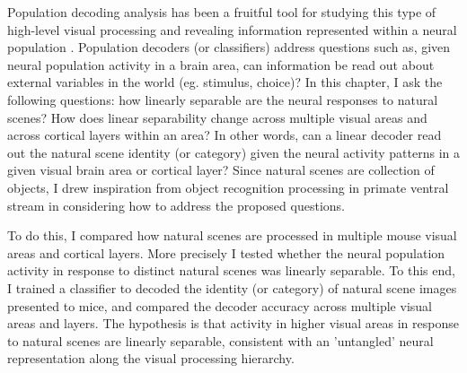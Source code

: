 Population decoding analysis has been a fruitful tool for studying this type of high-level visual processing and revealing information represented within a neural population \parencite{Hung2005,Rust2010a,Pagan2013}. Population decoders (or classifiers) address questions such as, given neural population activity in a brain area, can information be read out about external variables in the world (eg. stimulus, choice)? In this chapter, I ask the following questions: how linearly separable are the neural responses to natural scenes? How does linear separability change across multiple visual areas and across cortical layers within an area? In other words, can a linear decoder read out the natural scene identity (or category) given the neural activity patterns in a given visual brain area or cortical layer? Since natural scenes are collection of objects, I drew inspiration from object recognition processing in primate ventral stream in considering how to address the proposed questions.  

To do this, I compared how natural scenes are processed in multiple mouse visual areas and cortical layers. More precisely I tested whether the neural population activity in response to distinct natural scenes was linearly separable. To this end, I trained a classifier to decoded the identity (or category) of natural scene images presented to mice, and compared the decoder accuracy across multiple visual areas and layers. The hypothesis is that activity in higher visual areas in response to natural scenes are linearly separable, consistent with an 'untangled' neural representation along the visual processing hierarchy. 

